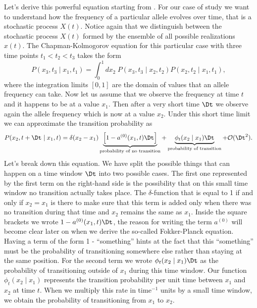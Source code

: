 Let's derive this powerful equation starting from .
For our case of study we want to understand how the frequency of a particular
allele evolves over time, that is a stochastic process $X(t)$. Notice again
that we distinguish between the stochastic process $X(t)$ formed by the
ensemble of all possible realizations $x(t)$. The Chapman-Kolmogorov equation
for this particular case with three time points $t_1 < t_2 < t_3$ takes the
form
\begin{equation}
  P(x_3, t_3 \mid x_1, t_1) = \int_0^1 dx_2\; P(x_3, t_3 \mid x_2, t_2)
                                          P(x_2, t_2 \mid x_1, t_1),
  \label{eq_chapman_freq}
\end{equation}
where the integration limits $[0, 1]$ are the domain of values that an allele
frequency can take. Now let us assume that we observe the frequency at time $t$
and it happens to be at a value $x_1$. Then after a very short time $\Dt$ we
observe again the allele frequency which is now at a value $x_2$. Under this
short time limit we can approximate the transition probability as
\begin{equation}
  P(x_2, t + \Dt \mid x_1, t) = \delta(x_2 - x_1)
  \underbrace{\left[ 1 - a^{(0)}(x_1, t) \Dt \right]}_{\text{probability
  of no transition}} +
  \underbrace{\phi_t(x_2 \mid x_1)\Dt}_\text{probability of transition} +
  \mathcal{O}(\Dt^2).
  \label{eq_transition_short_time}
\end{equation}
Let's break down this equation. We have split the possible things that can
happen on a time window $\Dt$ into two possible cases. The first one
represented by the first term on the right-hand side is the possibility that on
this small time window no transition actually takes place. The
$\delta$-function that is equal to 1 if and only if $x_2 = x_1$ is there to
make sure that this term is added only when there was no transition during that
time and $x_2$ remains the same as $x_1$. Inside the square brackets we wrote
$1 - a^{(0)}(x_1, t) \Dt$, the reason for writing the term $a^{(0)}$ will
become clear later on when we derive the so-called Fokker-Planck equation.
Having a term of the form 1 - ``something'' hints at the fact that this
``something'' must be the probability of transitioning somewhere else rather
than staying at the same position. For the second term we wrote $\phi_t(x_2
\mid x_1)\Dt$ as the probability of transitioning outside of $x_1$ during this
time window. Our function $\phi_t(x_2 \mid x_1)$ represents the transition
probability per unit time between $x_1$ and $x_2$ at time $t$. When we multiply
this rate in time$^{-1}$ units by a small time window, we obtain the
probability of transitioning from $x_1$ to $x_2$.


